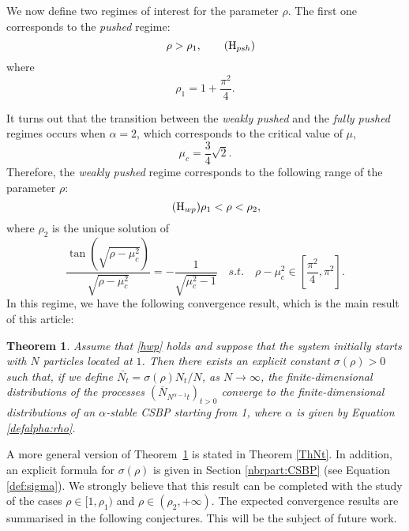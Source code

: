 \documentclass[11pt]{article}
\theoremstyle{plain}
\newtheorem{theorem}[lemma]{Theorem}
\begin{document}
We now define two regimes of interest for the parameter $\rho$. The first one corresponds to  the \textit{pushed} regime:
\begin{equation}\label{hpushed} 
\quad 
\rho>\rho_1,\tag{H$_{psh}$}
\end{equation}
 where
\begin{equation*}
\rho_1=1+\frac{\pi^2}{4}.
\end{equation*}

It turns out that the transition between the \textit{weakly pushed} and the \textit{fully pushed} regimes occurs when $\alpha=2$, which corresponds to the critical value of $\mu$, 
\begin{equation}\label{def:muc}
\mu_c=\frac{3}{4}\sqrt{2}.
\end{equation}
Therefore, the \textit{weakly pushed} regime corresponds to the following range of the parameter $\rho$:
\begin{equation}\tag{H$_{wp}$}
\label{hwp}
\rho_1<\rho<\rho_2,
\end{equation}
where $\rho_2$ is the unique solution of
\begin{equation*}
\frac{\tan\left(\sqrt{\rho-\mu_c^2}\right)}{\sqrt{\rho-\mu_c^2}}=-\frac{1}{\sqrt{\mu_c^2-1}}\quad s.t. \quad \rho-\mu_c^2 \in\left[\frac{\pi^2}{4},\pi^2\right]. 
\end{equation*}
In this regime, we have the following convergence result, which is the main result of this article:
\begin{theorem}\label{semipushedfr}
Assume that \eqref{hwp} holds and suppose that the system initially starts with $N$ particles located at $1$. Then there exists an explicit constant $\sigma(\rho)>0$ such that, if we define $\bar{N_t}= \sigma(\rho) N_t/N$,  as $N\to\infty$, the finite-dimensional distributions of the processes $(\overline N_{N^{\alpha-1}t})_{t>0}$ converge to the finite-dimensional distributions of an $\alpha$-stable CSBP starting from 1, where $\alpha$ is given by Equation \eqref{defalpha:rho}.
\end{theorem}

A more general version of Theorem~\ref{semipushedfr} is stated in Theorem \ref{ThNt}. In addition, an explicit formula for $\sigma(\rho)$ is given in Section \ref{nbrpart:CSBP} (see Equation \eqref{def:sigma}). We strongly believe that this result can be completed with the study of the cases $\rho\in[1,\rho_1)$ and $\rho\in(\rho_2,+\infty)$. The expected convergence results are summarised in the following conjectures. This will be the subject of future work. 
\end{document}
